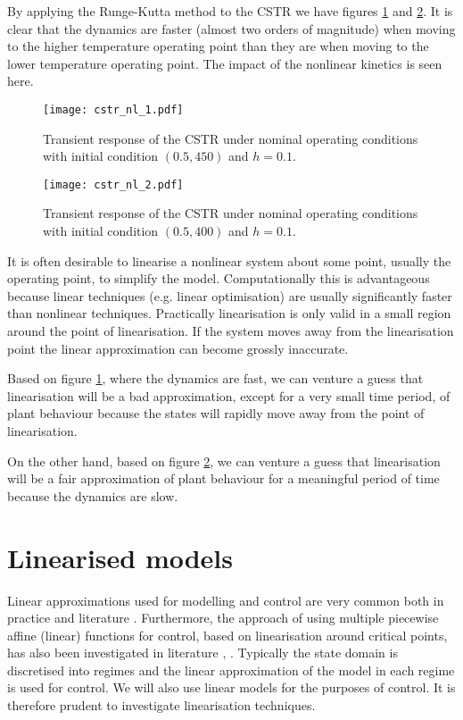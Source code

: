 By applying the Runge-Kutta method to the CSTR we have figures \ref{fig_cstr_nl_1} and \ref{fig_cstr_nl_2}. It is clear that the dynamics are faster (almost two orders of magnitude) when moving to the higher temperature operating point than they are when moving to the lower temperature operating point. The impact of the nonlinear kinetics is seen here. 
\begin{figure}[H] 
\centering
\texttt{[image: cstr\_nl\_1.pdf]}
\caption{Transient response of the CSTR under nominal operating conditions with initial condition $(0.5, 450)$ and $h=0.1$.}
\label{fig_cstr_nl_1}
\end{figure}
\begin{figure}[H] 
\centering
\texttt{[image: cstr\_nl\_2.pdf]}
\caption{Transient response of the CSTR under nominal operating conditions with initial condition $(0.5, 400)$ and $h=0.1$.}
\label{fig_cstr_nl_2}
\end{figure}
It is often desirable to linearise a nonlinear system about some point, usually the operating point, to simplify the model. Computationally this is advantageous because linear techniques (e.g. linear optimisation) are usually significantly faster than nonlinear techniques. Practically linearisation is only valid in a small region around the point of linearisation. If the system moves away from the linearisation point the linear approximation can become grossly inaccurate. 

Based on figure \ref{fig_cstr_nl_1}, where the dynamics are fast, we can venture a guess that linearisation will be a bad approximation, except for a very small time period, of plant behaviour because the states will rapidly move away from the point of linearisation.

On the other hand, based on figure \ref{fig_cstr_nl_2}, we can venture a guess that linearisation will be a fair approximation of plant behaviour for a meaningful period of time because the dynamics are slow.

\section{Linearised models}
Linear approximations used for modelling and control are very common both in practice and literature \cite{luyben}. Furthermore, the approach of using multiple piecewise affine (linear) functions for control, based on linearisation around critical points, has also been investigated in literature \cite{du}, \cite{kvasnica}. Typically the state domain is discretised into regimes and the linear approximation of the model in each regime is used for control. We will also use linear models for the purposes of control.  It is therefore prudent to investigate linearisation techniques.

